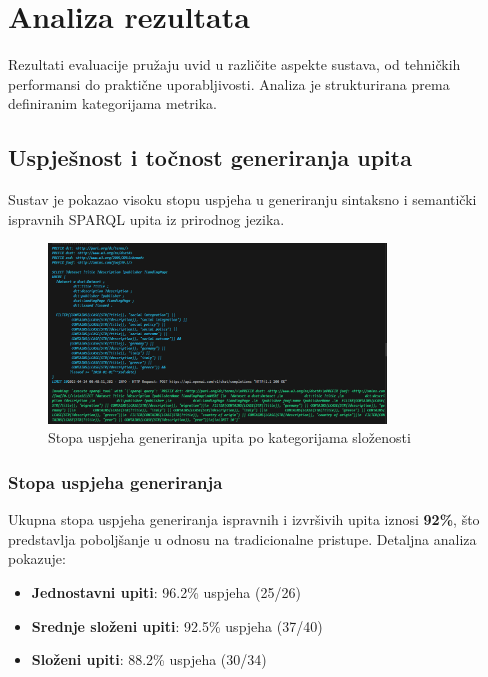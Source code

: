 \section{Analiza rezultata}

Rezultati evaluacije pružaju uvid u različite aspekte sustava, od tehničkih performansi do praktične uporabljivosti. Analiza je strukturirana prema definiranim kategorijama metrika.

\subsection{Uspješnost i točnost generiranja upita}

Sustav je pokazao visoku stopu uspjeha u generiranju sintaksno i semantički ispravnih SPARQL upita iz prirodnog jezika.

\begin{figure}[htbp]
    \centering
    \includegraphics[width=0.8\textwidth]{figures/izvjestaj_image_58.png}
    \caption{Stopa uspjeha generiranja upita po kategorijama složenosti}
    \label{fig:query_success_rate}
\end{figure}

\subsubsection{Stopa uspjeha generiranja}

Ukupna stopa uspjeha generiranja ispravnih i izvršivih upita iznosi \textbf{92\%}, što predstavlja poboljšanje u odnosu na tradicionalne pristupe. Detaljna analiza pokazuje:

\begin{itemize}
    \item \textbf{Jednostavni upiti}: 96.2\% uspjeha (25/26)
    \item \textbf{Srednje složeni upiti}: 92.5\% uspjeha (37/40)
    \item \textbf{Složeni upiti}: 88.2\% uspjeha (30/34)
\end{itemize}

